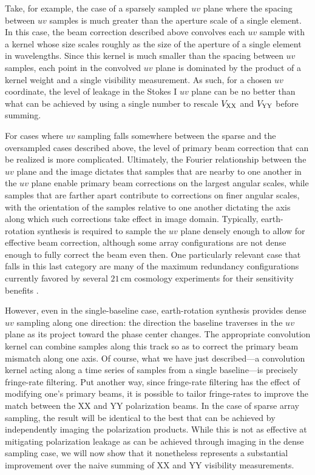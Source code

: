 \documentclass[twocolumn,apj,numberedappendix]{emulateapj}
\begin{document}
Take, for example, the case of a sparsely sampled $uv$ plane where the spacing between $uv$ samples is much greater than
the aperture scale of a single element.  In this case, the beam correction described above 
convolves each $uv$ sample with a kernel whose size scales roughly as the size of the aperture of a
single element in wavelengths.  Since this kernel is much smaller than the spacing between $uv$ samples, 
each point in the convolved $uv$ plane is dominated by the product of a kernel weight and a single visibility measurement.
As such, for a chosen $uv$ coordinate, the level of leakage in the Stokes I $uv$ plane can
be no better than what can be achieved by using a single number to rescale ${V_{\rm XX}}$ and ${V_{\rm YY}}$ before summing.  

For cases where $uv$ sampling falls somewhere between the sparse and the oversampled cases described above, the level
of primary beam correction that can be realized is more complicated.  Ultimately, the Fourier relationship between
the $uv$ plane and the image dictates that samples that are nearby to one
another in the $uv$ plane enable primary beam corrections on the largest angular scales, while samples that are farther
apart contribute to corrections on finer angular scales, with the orientation of the samples relative to one another
dictating the axis along which such corrections take effect in image domain.  Typically, earth-rotation synthesis
is required to sample the $uv$ plane densely enough to allow for effective beam correction, although some array
configurations are not dense enough to fully correct the beam even then.  One particularly relevant case that falls
in this last category are many of the maximum redundancy configurations currently favored by several $21\,\textrm{cm}$ cosmology experiments
for their sensitivity benefits \citep{parsons_et_al2012a,P14}.

However, even in the single-baseline case, earth-rotation synthesis provides dense $uv$ sampling along one direction: the
direction the baseline traverses in the $uv$ plane as its project toward the phase center changes.  The appropriate
convolution kernel can combine samples along this track so as to correct the primary beam mismatch along one axis.
Of course, what we have just described---a convolution kernel acting along a time series
of samples from a single baseline---is precisely fringe-rate filtering.  Put another way, since fringe-rate filtering has the effect of modifying one's primary beams, it is possible to tailor fringe-rates to improve the match between the XX and YY polarization beams. In the case of sparse array sampling, the result will be identical to the best that can be achieved by independently
imaging the polarization products.  While this is not as effective at mitigating polarization leakage as can be achieved
through imaging in the dense sampling case, we will now show that it nonetheless represents a substantial improvement
over the naive summing of XX and YY visibility measurements.
\end{document}
